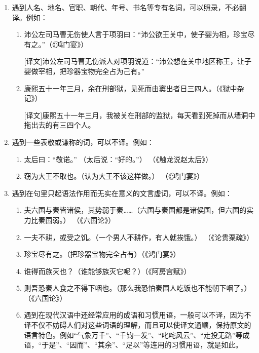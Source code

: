 \noindent
\begin{enumerate}
	\item 遇到人名、地名、官职、朝代、年号、书名等专有名词，可以照录，不必翻译。例如：
	\begin{enumerate}[label=\textcircled{\arabic*}]
		\item 沛公左司马曹无伤使人言于项羽曰：“沛公欲王关中，使子婴为相，珍宝尽有之。”（《鸿门宴》）
		
		[译文]沛公左司马曹无伤派人对项羽说道：“沛公想在关中地区称王，让子婴做宰相，把珍器宝物完全占为己有。”
		
		\item 康熙五十一年三月，余在刑部狱，见死而由窦出者日三四人。（《狱中杂记》）
		
		[译文]康熙五十一年三月，我被关在刑部的监狱，每天看到死掉而从墙洞中拖出去的有三四个人。
	\end{enumerate}
	\newpage
	\item 遇到一些表敬或谦称的词，可以不译。例如：
	\begin{enumerate}[label=\textcircled{\arabic*}]
		\item 太后曰：“敬诺。” （太后说：“好的。”） （《触龙说赵太后》）
		\item 窃为大王不取也。（认为大王不该这样做。） （《鸿门宴》）
	\end{enumerate}
	\item 遇到在句里只起语法作用而无实在意义的文言虚词，可以不译。例如：
	\begin{enumerate}[label=\textcircled{\arabic*}]
		\item 夫六国与秦皆诸侯，其势弱于秦……（六国与秦国都是诸侯国，但六国的实力比秦国弱。） （《六国论》）
		\item 一夫不耕，或受之饥。（一个男人不耕作，有人就挨饿。） （《论贵粟疏》）
		\item 珍宝尽有之。（把珍器宝物完全占有）（《鸿门宴》）
		\item 谁得而族灭也？（谁能够族灭它呢？）（《阿房宫赋》）
		\item 则吾恐秦人食之不得下咽也。（那么我恐怕秦国人吃饭也不能朝下咽了。） （《六国论》）
		\item 遇到在现代汉语中还经常应用的成语和习惯用语，一般可以不译，因为不译不仅不妨碍人们对这些词语的理解，而且可以使译文通顺，保持原文的语言特色。例如“气象万千”、“千钧一发”、“叱咤风云”、“走投无路”等成语，“于是”、“因而”、“其余”、“足以”等连用的习惯用语，就是如此。
	\end{enumerate}
\end{enumerate}
\newpage